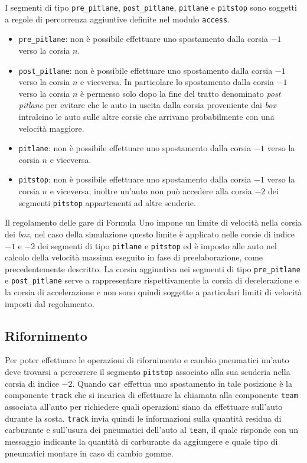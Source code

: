 \documentclass[11pt,a4paper]{report}
\begin{document}
I segmenti di tipo \texttt{pre\_pitlane}, \texttt{post\_pitlane}, \texttt{pitlane} e \texttt{pitstop} sono soggetti a regole di percorrenza aggiuntive definite nel modulo \texttt{access}.
\begin{itemize}
\item \texttt{pre\_pitlane}: non è possibile effettuare uno spostamento dalla corsia $-1$ verso la corsia $n$.
\item \texttt{post\_pitlane}: non è possibile effettuare uno spostamento dalla corsia $-1$ verso la corsia $n$ e viceversa. In particolare lo spostamento dalla corsia $-1$ verso la corsia $n$ è permesso solo dopo la fine del tratto denominato \textit{post pitlane} per evitare che le auto in uscita dalla corsia proveniente dai \textit{box} intralcino le auto sulle altre corsie che arrivano probabilmente con una velocità maggiore.
\item \texttt{pitlane}: non è possibile effettuare uno spostamento dalla corsia $-1$ verso la corsia $n$ e viceversa.
\item \texttt{pitstop}: non è possibile effettuare uno spostamento dalla corsia $-1$ verso la corsia $n$ e viceversa; inoltre un'auto non può accedere alla corsia $-2$ dei segmenti \texttt{pitstop} appartenenti ad altre scuderie.
\end{itemize}

Il regolamento delle gare di Formula Uno impone un limite di velocità nella corsia dei \textit{box}, nel caso della simulazione questo limite è applicato nelle corsie di indice $-1$ e $-2$ dei segmenti di tipo \texttt{pitlane} e \texttt{pitstop} ed è imposto alle auto nel calcolo della velocità massima eseguito in fase di preelaborazione, come precedentemente descritto.
La corsia aggiuntiva nei segmenti di tipo \texttt{pre\_pitlane} e \texttt{post\_pitlane} serve a rappresentare rispettivamente la corsia di decelerazione e la corsia di accelerazione e non sono quindi soggette a particolari limiti di velocità imposti dal regolamento.

\subsection{Rifornimento}
\label{sec:rifornimento}
Per poter effettuare le operazioni di rifornimento e cambio pneumatici un'auto deve trovarsi a percorrere il segmento \texttt{pitstop} associato alla sua scuderia nella corsia di indice $-2$. Quando \texttt{car} effettua uno spostamento in tale posizione è la componente \texttt{track} che si incarica di effettuare la chiamata alla componente \texttt{team} associata all'auto per richiedere quali operazioni siano da effettuare sull'auto durante la sosta. \texttt{track} invia quindi le informazioni sulla quantità residua di carburante e sull'usura dei pneumatici dell'auto al \texttt{team}, il quale risponde con un messaggio indicante la quantità di carburante da aggiungere e quale tipo di pneumatici montare in caso di cambio gomme.
\end{document}
